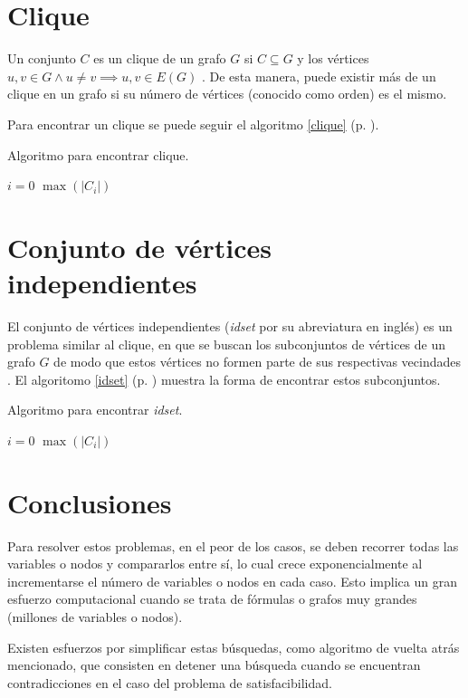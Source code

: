 \documentclass[paper=leter, fontsize=11pt]{scrartcl}
\numberwithin{equation}{section}		%
\numberwithin{figure}{section}			%
\numberwithin{table}{section}				%
\begin{document}
\section{Clique}

Un conjunto $C$ es un clique de un grafo $G$ si $C \subseteq G$ y los vértices $u, v \in G \land u \neq v \implies u, v \in E(G)$ \cite{clique}. De esta manera, puede existir más de un clique en un grafo si su número de vértices (conocido como orden) es el mismo.

Para encontrar un clique se puede seguir el algoritmo \ref{clique} (p. \pageref{clique}).

\begin{algorithm} %
	\caption{Algoritmo para encontrar clique.}
	\label{clique}
	\SetAlgoLined

	\(i = 0\)\;
	\Return \(\max(|C_i|)\)
\end{algorithm}

\section{Conjunto de vértices independientes}

El conjunto de vértices independientes (\textit{idset} por su abreviatura en inglés) es un problema similar al clique, en que se buscan los subconjuntos de vértices de un grafo $G$ de modo que estos vértices no formen parte de sus respectivas vecindades \cite{idset}. El algoritomo \ref{idset} (p. \pageref{idset}) muestra la forma de encontrar estos subconjuntos.

\begin{algorithm} %
	\caption{Algoritmo para encontrar \textit{idset}.}
	\label{idset}
	\SetAlgoLined

	\(i = 0\)\;
	\Return \(\max(|C_i|)\)
\end{algorithm}

\section{Conclusiones}

Para resolver estos problemas, en el peor de los casos, se deben recorrer todas las variables o nodos y compararlos entre sí, lo cual crece exponencialmente al incrementarse el número de variables o nodos en cada caso. Esto implica un gran esfuerzo computacional cuando se trata de fórmulas o grafos muy grandes (millones de variables o nodos). 

Existen esfuerzos por simplificar estas búsquedas, como algoritmo de vuelta atrás mencionado, que consisten en detener una búsqueda cuando se encuentran contradicciones en el caso del problema de satisfacibilidad.




\end{document}
